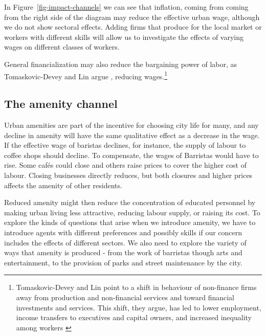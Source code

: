 In Figure~\ref{fig-impact-channels} we can see that inflation, coming from coming from the right side of the diagram may reduce the effective urban wage, although we do not show sectoral effects. 
Adding firms that produce for the local market or workers with different skills will allow us to investigate the effects of varying wages on different classes of workers.

General financialization may also reduce the bargaining power of labor, as Tomaskovic-Devey and Lin argue \cite{tomaskovic-deveyFinancializationCausesInequality2013}, reducing wages.\footnote{Tomaskovic-Devey and Lin point to a shift in behaviour of non-finance firms away from production and non-financial services and toward financial investments and services. This shift, they argue, has led to lower employment, income transfers to executives and capital owners, and increased inequality among workers \cite{tomaskovic-deveyFinancializationCausesInequality2013}}



\subsection{The amenity channel}
Urban amenities are part of the incentive for choosing city life for many, and any decline in amenity will have the same qualitative effect as a decrease in the wage.  If the effective wage of  baristas declines, for instance, the supply of labour to coffee shops should decline. To compensate, the wages of Barristas would have to rise.  Some caf\'es could close and others raise prices to cover the higher cost of labour. Closing businesses directly reduces, but both closures and higher prices affects the amenity of other residents.

Reduced amenity might then reduce the concentration of educated personnel by %
making urban living less attractive, reducing labour supply, or raising its cost. To explore the kinds  of questions that  arise when we introduce amenity, we have to introduce agents with different preferences and possibly skills if our  concern includes the effects of different sectors.  We also need to explore the variety of ways that amenity is produced - from the work of barristas though arts and entertainment, to the provision of parks and street maintenance by the city.


